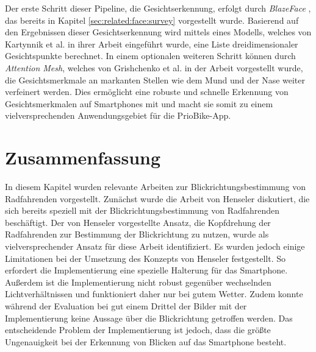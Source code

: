 Der erste Schritt dieser Pipeline, die Gesichtserkennung, erfolgt durch \textit{BlazeFace} \cite{paper:mediapipe:blazeface}, das bereits in Kapitel \ref{sec:related:face:survey} vorgestellt wurde. Basierend auf den Ergebnissen dieser Gesichtserkennung wird mittels eines Modells, welches von Kartynnik et al. in ihrer Arbeit \cite{paper:mediapipe:landmarks} eingeführt wurde, eine Liste dreidimensionaler Gesichtspunkte berechnet.  In einem optionalen weiteren Schritt können durch \textit{Attention Mesh}, welches von Grishchenko et al. in der Arbeit \cite{paper:mediapipe:attention} vorgestellt wurde, die Gesichtsmerkmale an markanten Stellen wie dem Mund und der Nase weiter verfeinert werden. 
Dies ermöglicht eine robuste und schnelle Erkennung von Gesichtsmerkmalen auf Smartphones mit \mediapipe und macht sie somit zu einem vielversprechenden Anwendungsgebiet für die PrioBike-App.

\section{Zusammenfassung}

In diesem Kapitel wurden relevante Arbeiten zur Blickrichtungsbestimmung von Radfahrenden vorgestellt. Zunächst wurde die Arbeit von Henseler \cite{bachelor:henseler:gaze-ebikes} diskutiert, die sich bereits speziell mit der Blickrichtungsbestimmung von Radfahrenden beschäftigt. Der von Henseler vorgestellte Ansatz, die Kopfdrehung der Radfahrenden zur Bestimmung der Blickrichtung zu nutzen, wurde als vielversprechender Ansatz für diese Arbeit identifiziert. Es wurden jedoch einige Limitationen bei der Umsetzung des Konzepts von Henseler festgestellt. So erfordert die Implementierung eine spezielle Halterung für das Smartphone. Außerdem ist die Implementierung nicht robust gegenüber wechselnden Lichtverhältnissen und funktioniert daher nur bei gutem Wetter. Zudem konnte während der Evaluation bei gut einem Drittel der Bilder mit der Implementierung keine Aussage über die Blickrichtung getroffen werden. Das entscheidende Problem der Implementierung ist jedoch, dass die größte Ungenauigkeit bei der Erkennung von Blicken auf das Smartphone besteht.

